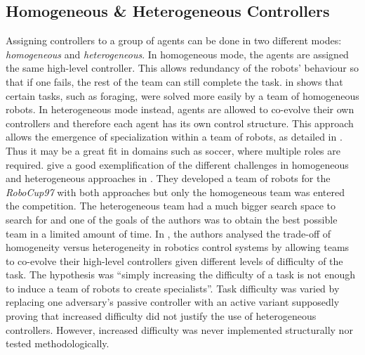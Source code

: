 \documentclass[conference]{IEEEtran}
\begin{document}
\subsection{Homogeneous \& Heterogeneous Controllers}
Assigning controllers to a group of agents can be done in two different modes: \textit{homogeneous} and \textit{heterogeneous}.
In homogeneous mode, the agents are assigned the same high-level controller.
This allows redundancy of the robots' behaviour so that if one fails, the rest of the team can still complete the task.
\citeauthor{balch1998behavioral} in \cite{balch1998behavioral} shows that certain tasks, such as foraging, were solved more easily by a team of homogeneous robots.
In heterogeneous mode instead, agents are allowed to co-evolve their own controllers and therefore each agent has its own control structure.
This approach allows the emergence of specialization within a team of robots, as detailed in \cite{balch1998behavioral}.
Thus it may be a great fit in domains such as soccer, where multiple roles are required.
\citeauthor{luke1998genetic} give a good exemplification of the different challenges in homogeneous and heterogeneous approaches in \cite{luke1998genetic}.
They developed a team of robots for the \textit{RoboCup97} with both approaches but only the homogeneous team was entered the competition.
The heterogeneous team had a much bigger search space to search for and one of the goals of the authors was to obtain the best possible team in a limited amount of time.
In \cite{potter2001heterogeneity}, the authors analysed the trade-off of homogeneity versus heterogeneity in robotics control systems by allowing teams to co-evolve their high-level controllers given different levels of difficulty of the task.
The hypothesis was ``simply increasing the difficulty of a task is not enough to induce a team of robots to create specialists''.
Task difficulty was varied by replacing one adversary's passive controller with an active variant supposedly proving that increased difficulty did not justify the use of heterogeneous controllers.
However, increased difficulty was never implemented structurally nor tested methodologically. 
\end{document}
